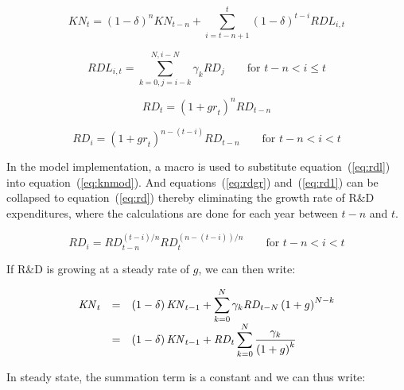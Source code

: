 \begin{equation}
\label{eq:knmod}
\mathit{KN}_{t} = \left( 1 - \delta \right)^n \mathit{KN}_{t-n}
+ \sum_{i=t-n+1}^{t}{\left( 1 - \delta \right)^{t-i} \mathit{RDL}_{i,t}}
\end{equation}

\begin{equation}
\label{eq:rdl}
\mathit{RDL}_{i,t} = \sum_{k=0, j=i-k}^{N,i-N}{\gamma_k \mathit{RD}_j}
\qquad \textrm{for } t-n<i \le t
\end{equation}

\begin{equation}
\label{eq:rdgr}
\mathit{RD}_{t} = \left( 1 + \mathit{gr}_t \right)^{n}
\mathit{RD}_{t-n}
\end{equation}

\begin{equation}
\label{eq:rd1}
\mathit{RD}_{i} = \left( 1 + \mathit{gr}_t \right)^{n-(t-i)}
\mathit{RD}_{t-n} \qquad \textrm{for } t-n<i<t
\end{equation}

In the model implementation, a macro is used to substitute
equation~(\ref{eq:rdl}) into equation~(\ref{eq:knmod}).
And equations~(\ref{eq:rdgr}) and~(\ref{eq:rd1}) can be collapsed to equation~(\ref{eq:rd})
thereby eliminating the growth rate of R\&D expenditures, where
the calculations are done for each year between $t-n$ and $t$.

\begin{equation}
\label{eq:rd}
\mathit{RD}_{i} = \mathit{RD}_{t-n}^{(t-i)/n}
\mathit{RD}_{t}^{(n-(t-i))/n} \qquad \textrm{for } t-n<i<t
\end{equation}

If R\&D is growing at a steady rate of $g$, we can then write:

\begin{equation}
\label{eq:knss}
\begin{array} {l c l}
\mathit{KN}_{t} & = & \displaystyle \left(1-\delta \right) \mathit{KN}_{t-1}
+ \sum_{k=0}^N{\gamma_{k} \mathit{RD}_{t-N} \left(1+g\right)^{N-k}} \\
{}  & = & \displaystyle \left(1-\delta \right) \mathit{KN}_{t-1}
+ \mathit{RD}_{t} \sum_{k=0}^N{ \frac{\gamma_{k}}{\left(1+g\right)^k} } \\
\end{array}
\end{equation}

\noindent In steady state, the summation term is a constant and we can
thus write:

